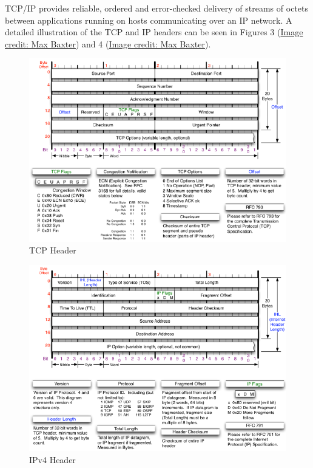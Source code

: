 \documentclass[12pt,]{article}
\begin{document}
TCP/IP provides reliable, ordered and error-checked delivery of streams
of octets between applications running on hosts communicating over an IP
network. A detailed illustration of the TCP and IP headers can be seen
in Figures 3
(\href{http://nmap.org/book/images/hdr/MJB-TCP-Header}{Image credit: Max
Baxter}) and 4
(\href{http://nmap.org/book/images/hdr/MJB-IP-Header}{Image credit: Max
Baxter}).

\begin{figure}

{\centering \includegraphics{thesis_files/figure-latex/unnamed-chunk-7-1} 

}

\caption{TCP Header}\label{fig:unnamed-chunk-7}
\end{figure}

\begin{figure}

{\centering \includegraphics{thesis_files/figure-latex/unnamed-chunk-8-1} 

}

\caption{IPv4 Header}\label{fig:unnamed-chunk-8}
\end{figure}
\end{document}
